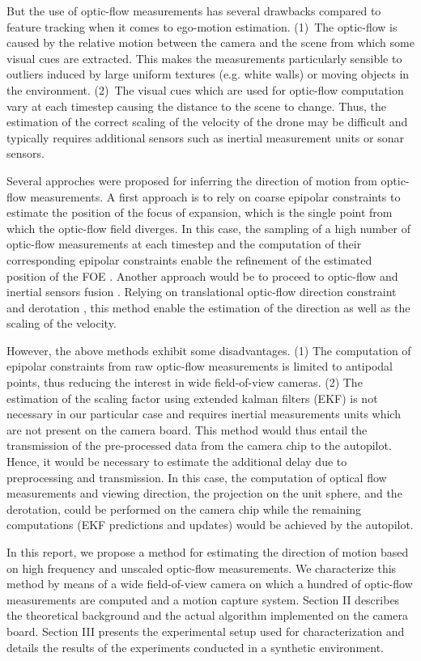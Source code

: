 But the use of optic-flow measurements has several drawbacks compared to feature tracking when it comes to ego-motion estimation. (1)~The optic-flow is caused by the relative motion between the camera and the scene from which some visual cues are extracted. This makes the measurements particularly sensible to outliers induced by large uniform textures (e.g. white walls) or moving objects in the environment. (2)~The visual cues which are used for optic-flow computation vary at each timestep causing the distance to the scene to change. Thus, the estimation of the correct scaling of the velocity of the drone may be difficult and typically requires additional sensors such as inertial measurement units \cite{ekf} or sonar sensors.

Several approches were proposed for inferring the direction of motion from optic-flow measurements. A first approach is to rely on coarse epipolar constraints to estimate the position of the focus of expansion, which is the single point from which the optic-flow field diverges. In this case, the sampling of a high number of optic-flow measurements at each timestep and the computation of their corresponding epipolar constraints enable the refinement of the estimated position of the FOE \cite{lim}. Another approach would be to proceed to optic-flow and inertial sensors fusion \cite{ekf}. Relying on translational optic-flow direction constraint and derotation \cite{derotation}, this method enable the estimation of the direction as well as the scaling of the velocity.

However, the above methods exhibit some disadvantages. (1) The computation of epipolar constraints from raw optic-flow measurements is limited to antipodal points, thus reducing the interest in wide field-of-view cameras. (2) The estimation of the scaling factor using extended kalman filters (EKF) is not necessary in our particular case and requires inertial measurements units which are not present on the camera board. This method would thus entail the transmission of the pre-processed data from the camera chip to the autopilot. Hence, it would be necessary to estimate the additional delay due to preprocessing and transmission. In this case, the computation of optical flow measurements and viewing direction, the projection on the unit sphere, and the derotation, could be performed on the camera chip while the remaining computations (EKF predictions and updates) would be achieved by the autopilot.

In this report, we propose a method for estimating the direction of motion based on high frequency and unscaled optic-flow measurements. We characterize this method by means of a wide field-of-view camera on which a hundred of optic-flow measurements are computed and a motion capture system. Section II describes the theoretical background and the actual algorithm implemented on the camera board. Section III presents the experimental setup used for characterization and details the results of the experiments conducted in a synthetic environment.